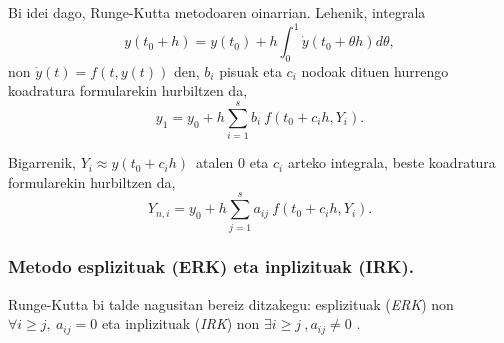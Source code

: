 Bi idei dago, Runge-Kutta metodoaren oinarrian. Lehenik, integrala
\begin{equation*}
y(t_0+h)=y(t_0)+h \int_{0}^{1} \dot{y}(t_0+\theta h) d\theta,
\end{equation*} 
non $\dot{y}(t)=f(t,y(t))$ den, $b_i$ pisuak eta $c_i$ nodoak dituen hurrengo koadratura formularekin hurbiltzen da,
\begin{equation*}
 y_{1}=y_0+h\sum^s_{i=1}{b_i \ f(t_0+c_ih,Y_{i})}.
\end{equation*}

Bigarrenik, $Y_{i} \approx y(t_0+c_ih)$~atalen $0$ eta $c_i$ arteko integrala, beste koadratura formularekin hurbiltzen da,
\begin{equation*}
Y_{n,i}=y_0+h \sum_{j=1}^{s} a_{ij} \ f(t_0+c_ih,Y_{i}).
\end{equation*}

\subsubsection*{Metodo esplizituak (ERK) eta inplizituak (IRK).}
Runge-Kutta bi talde nagusitan bereiz ditzakegu: esplizituak (\emph {ERK}) non $\forall i\ge j, \ a_{ij}=0 $ eta inplizituak (\emph {IRK}) non $\exists i \ge j \ , a_{ij} \ne 0$ . 


